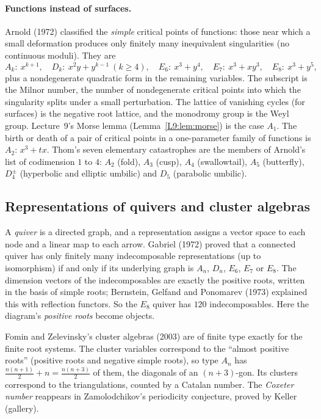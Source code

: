 \paragraph{Functions instead of surfaces.} Arnold (1972) classified the \emph{simple} critical points of
functions: those near which a small deformation produces only finitely many inequivalent singularities
(no continuous moduli). They are
\[
  A_k:\ x^{k+1},\quad D_k:\ x^2y+y^{k-1}\ (k\ge4),\quad E_6:\ x^3+y^4,\quad E_7:\ x^3+xy^3,\quad E_8:\ x^3+y^5,
\]
plus a nondegenerate quadratic form in the remaining variables. The subscript is the Milnor number, the
number of nondegenerate critical points into which the singularity splits under a small perturbation. The
lattice of vanishing cycles (for surfaces) is the negative root lattice, and the monodromy group is the
Weyl group. Lecture~9's Morse lemma (Lemma~\ref{L9:lem:morse}) is the case $A_1$. The birth or death of
a pair of critical points in a one-parameter family of functions is $A_2$: $x^3+tx$. Thom's seven elementary catastrophes are the members of Arnold's list of codimension $1$ to
$4$: $A_2$ (fold), $A_3$ (cusp), $A_4$ (swallowtail), $A_5$ (butterfly), $D_4^\pm$ (hyperbolic and elliptic
umbilic) and $D_5$ (parabolic umbilic).

\subsection*{Representations of quivers and cluster algebras}
A \emph{quiver} is a directed graph, and a representation assigns a vector space to each node and a
linear map to each arrow. Gabriel (1972) proved that a connected quiver has only finitely many
indecomposable representations (up to isomorphism) if and only if its underlying graph is $A_n$, $D_n$,
$E_6$, $E_7$ or $E_8$. The dimension vectors of the indecomposables are exactly the positive roots,
written in the basis of simple roots; Bernstein, Gelfand and Ponomarev (1973) explained this with
reflection functors. So the $E_8$ quiver has $120$ indecomposables. Here the diagram's
\emph{positive roots} become objects.

Fomin and Zelevinsky's cluster algebras (2003) are of finite type exactly for the finite root
systems. The cluster variables correspond to the ``almost positive roots'' (positive roots and negative
simple roots), so type $A_n$ has $\frac{n(n+1)}2+n=\frac{n(n+3)}2$ of them, the diagonals of an
$(n+3)$-gon. Its clusters correspond to the triangulations, counted by a Catalan number. The
\emph{Coxeter number} reappears in Zamolodchikov's periodicity conjecture, proved by Keller (gallery).


